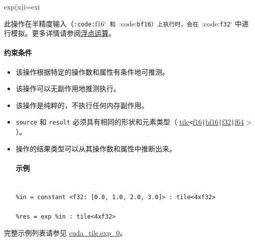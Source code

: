 \documentclass{article}
\begin{document}
exp(x)i=exi


此操作在半精度输入（\texttt{:code:}f16`\texttt{ 和 }:code:\texttt{bf16}\texttt{）上执行时，会在 }:code:\texttt{f32}` 中进行模拟。更多详情请参阅\href{https://docs.nvidia.com/cuda/tile-ir/latest/sections/operations.html#op-group-floating-point}{浮点运算}。





\paragraph{约束条件}


\begin{itemize}
\item 该操作根据特定的操作数和属性有条件地可推测。
\item 该操作可以无副作用地推测执行。
\item 该操作是纯粹的，不执行任何内存副作用。
\item \texttt{source} 和 \texttt{result} 必须具有相同的形状和元素类型（ \href{https://docs.nvidia.com/cuda/tile-ir/latest/sections/types.html#type-tile}{tile}\texttt{<}\href{https://docs.nvidia.com/cuda/tile-ir/latest/sections/types.html#subsection-element-types}{f16}\texttt{|}\href{https://docs.nvidia.com/cuda/tile-ir/latest/sections/types.html#subsection-element-types}{bf16}\texttt{|}\href{https://docs.nvidia.com/cuda/tile-ir/latest/sections/types.html#subsection-element-types}{f32}\texttt{|}\href{https://docs.nvidia.com/cuda/tile-ir/latest/sections/types.html#subsection-element-types}{f64} > ）。
\item 操作的结果类型可以从其操作数和属性中推断出来。




\paragraph{示例}


\begin{lstlisting}

%in = constant <f32: [0.0, 1.0, 2.0, 3.0]> : tile<4xf32>

%res = exp %in : tile<4xf32>

\end{lstlisting}



\end{itemize}
完整示例列表请参见 \href{https://docs.nvidia.com/cuda/tile-ir/latest/sections/appendix.html#example-cuda-tile-exp-0}{cuda\_tile.exp\_0}。
\end{document}
